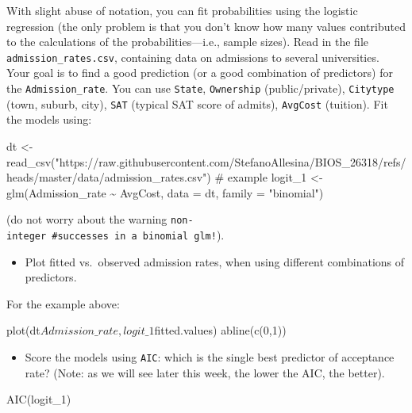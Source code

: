 \documentclass[
  letterpaper,
  DIV=11,
  numbers=noendperiod]{scrreprt}
\newenvironment{Shaded}{\begin{snugshade}}{\end{snugshade}}
\newcommand{\NormalTok}[1]{\textcolor[rgb]{0.00,0.23,0.31}{#1}}
\providecommand{\tightlist}{%
  \setlength{\itemsep}{0pt}\setlength{\parskip}{0pt}}\usepackage{longtable,booktabs,array}
\begin{document}
With slight abuse of notation, you can fit probabilities using the
logistic regression (the only problem is that you don't know how many
values contributed to the calculations of the probabilities---i.e.,
sample sizes). Read in the file \texttt{admission\_rates.csv},
containing data on admissions to several universities. Your goal is to
find a good prediction (or a good combination of predictors) for the
\texttt{Admission\_rate}. You can use \texttt{State}, \texttt{Ownership}
(public/private), \texttt{Citytype} (town, suburb, city), \texttt{SAT}
(typical SAT score of admits), \texttt{AvgCost} (tuition). Fit the
models using:

\begin{Shaded}
\begin{Highlighting}[]
\NormalTok{dt \textless{}{-} read\_csv("https://raw.githubusercontent.com/StefanoAllesina/BIOS\_26318/refs/heads/master/data/admission\_rates.csv")}
\NormalTok{\# example}
\NormalTok{logit\_1 \textless{}{-} glm(Admission\_rate \textasciitilde{} AvgCost, data = dt, family = "binomial")}
\end{Highlighting}
\end{Shaded}

(do not worry about the warning
\texttt{non-integer\ \#successes\ in\ a\ binomial\ glm!}).

\begin{itemize}
\tightlist
\item
  Plot fitted vs.~observed admission rates, when using different
  combinations of predictors.
\end{itemize}

For the example above:

\begin{Shaded}
\begin{Highlighting}[]
\NormalTok{plot(dt$Admission\_rate, logit\_1$fitted.values)}
\NormalTok{abline(c(0,1))}
\end{Highlighting}
\end{Shaded}

\begin{itemize}
\tightlist
\item
  Score the models using \texttt{AIC}: which is the single best
  predictor of acceptance rate? (Note: as we will see later this week,
  the lower the AIC, the better).
\end{itemize}

\begin{Shaded}
\begin{Highlighting}[]
\NormalTok{AIC(logit\_1)}
\end{Highlighting}
\end{Shaded}
\end{document}
